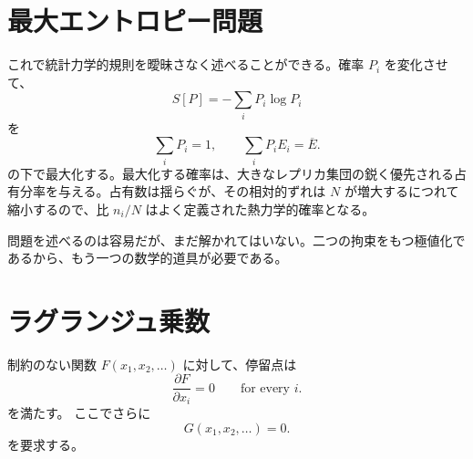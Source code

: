\begin{classroomqa}
\end{classroomqa}

\section{最大エントロピー問題}

これで統計力学的規則を曖昧さなく述べることができる。確率 \(P_i\) を変化させて、
\begin{equation}
 S[P]=-\sum_iP_i\log P_i
 \label{eq:sm3-maximize-entropy}
\end{equation}
を
\begin{equation}
 \sum_iP_i=1,
 \qquad
 \sum_iP_iE_i=\overline E.
 \label{eq:sm3-maxent-constraints}
\end{equation}
の下で最大化する。最大化する確率は、大きなレプリカ集団の鋭く優先される占有分率を与える。占有数は揺らぐが、その相対的ずれは \(N\) が増大するにつれて縮小するので、比 \(n_i/N\) はよく定義された熱力学的確率となる。

\begin{classroomqa}
\end{classroomqa}

問題を述べるのは容易だが、まだ解かれてはいない。二つの拘束をもつ極値化であるから、もう一つの数学的道具が必要である。

\section{ラグランジュ乗数}

制約のない関数 \(F(x_1,x_2,\ldots)\) に対して、停留点は
\begin{equation}
 \frac{\partial F}{\partial x_i}=0
 \qquad\text{for every }i.
 \label{eq:sm3-unconstrained-stationary}
\end{equation}
を満たす。
ここでさらに
\begin{equation}
 G(x_1,x_2,\ldots)=0.
 \label{eq:sm3-one-constraint}
\end{equation}
を要求する。

